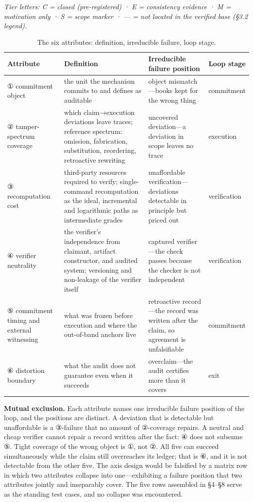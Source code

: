 \documentclass[11pt,a4paper]{article}
\begin{document}
\textit{Tier letters: C = closed (pre-registered) · E = consistency evidence · M = motivation only · S = scope marker · — = not located in the verified base (§3.2 legend).}

\begin{table}[htbp]
\centering
\footnotesize
\setlength{\tabcolsep}{3.5pt}
\renewcommand{\arraystretch}{1.18}
\begin{tabularx}{0.985\textwidth}{>{\raggedright\arraybackslash}p{} >{\raggedright\arraybackslash}X >{\raggedright\arraybackslash}p{} >{\raggedright\arraybackslash}p{}}
\toprule
\textbf{Attribute} & \textbf{Definition} & \textbf{Irreducible failure position} & \textbf{Loop stage} \\
\midrule
① commitment object & the unit the mechanism commits to and defines as auditable & object mismatch—books kept for the wrong thing & commitment \\
② tamper-spectrum coverage & which claim→execution deviations leave traces; reference spectrum: omission, fabrication, substitution, reordering, retroactive rewriting & uncovered deviation—a deviation in scope leaves no trace & execution \\
③ recomputation cost & third-party resources required to verify; single-command recomputation as the ideal, incremental and logarithmic paths as intermediate grades & unaffordable verification—deviations detectable in principle but priced out & verification \\
④ verifier neutrality & the verifier's independence from claimant, artifact constructor, and audited system; versioning and non-leakage of the verifier itself & captured verifier—the check passes because the checker is not independent & verification \\
⑤ commitment timing and external witnessing & what was frozen before execution and where the out-of-band anchors live & retroactive record—the record was written after the claim, so agreement is unfalsifiable & commitment \\
⑥ distortion boundary & what the audit does not guarantee even when it succeeds & overclaim—the audit certifies more than it covers & exit \\
\bottomrule
\end{tabularx}
\caption{The six attributes: definition, irreducible failure, loop stage.}
\label{tab:T2}
\end{table}

\textbf{Mutual exclusion.} Each attribute names one irreducible failure position of the loop, and the positions are distinct. A deviation that is detectable but unaffordable is a ③-failure that no amount of ②-coverage repairs. A neutral and cheap verifier cannot repair a record written after the fact: ④ does not subsume ⑤. Tight coverage of the wrong object is ①, not ②. All five can succeed simultaneously while the claim still overreaches its ledger; that is ⑥, and it is not detectable from the other five. The axis design would be falsified by a matrix row in which two attributes collapse into one—exhibiting a failure position that two attributes jointly and inseparably cover. The five rows assembled in §4–§8 serve as the standing test cases, and no collapse was encountered.
\end{document}
